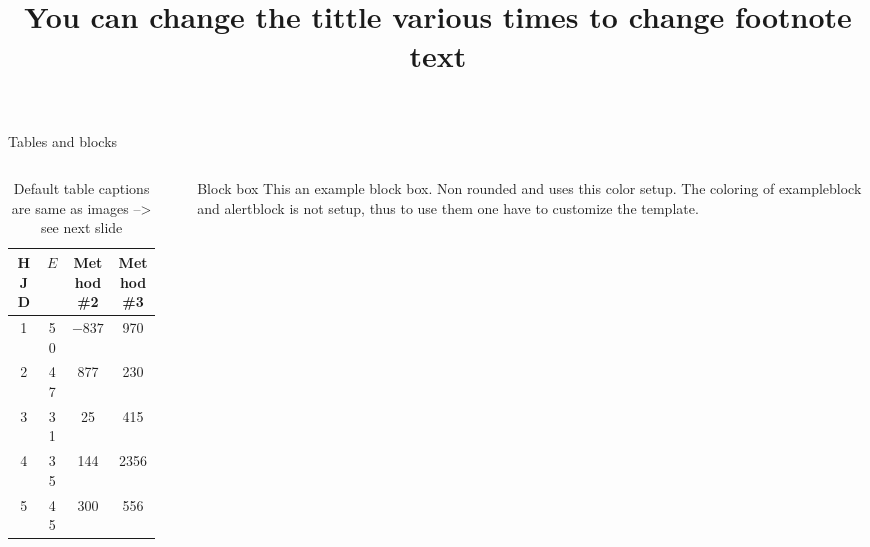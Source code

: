 \documentclass[9pt,t]{beamer} %
\begin{document}
\begin{frame}{Tables and blocks}
  \begin{columns}
    \begin{column}{0.4\textwidth}
      \begin{table}
      \centering                                      %
      \caption{\centering Default table captions are same as images --> see next slide}              %
        \begin{tabular}{c c c c}          %
        \toprule                        %
        HJD & $E$ & Method\#2 & Method\#3 \\    %
        \midrule                                   %
            1 & 50 & $-837$ & 970 \\      %
            2 & 47 & 877      & 230 \\
            3 & 31 & 25        & 415 \\
            4 & 35 & 144      & 2356 \\
            5 & 45 & 300      & 556 \\
        \bottomrule                                             %
        \end{tabular}
      \end{table}
    \end{column}
    \begin{column}{0.1\textwidth}
    \end{column}
    \begin{column}{0.4\textwidth}
      \centering
      \begin{block}{Block box}
        This an example block box. Non rounded and uses this color setup. The coloring of exampleblock and alertblock is not setup, thus to use them one have to customize the template. 
      \end{block}
    \end{column}
  \end{columns}
\end{frame}
\title{You can change the tittle various times to change footnote text} %
\end{document}
